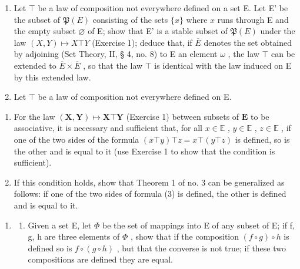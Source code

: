 \begin{enumerate}
\def\labelenumi{\arabic{enumi}.}
\setcounter{enumi}{1}
\item
  Let \(\top\) be a law of composition not everywhere defined on a set E. Let E' be the subset of \(\mathfrak{P}(E)\) consisting of the sets \(\{x\}\) where \(x\) runs through E and the empty subset \(\varnothing\) of E; show that E' is a stable subset of \(\mathfrak{P}(E)\) under the law \((X,Y)\mapsto X\top Y\) (Exercise 1); deduce that, if \(\overline{E}\) denotes the set obtained by adjoining (Set Theory, II, § 4, no. 8) to E an element \(\omega\) , the law \(\top\) can be extended to \(\overline{E} \times \overline{E}\) , so that the law \(\top\) is identical with the law induced on E by this extended law.
\item
  Let \(\top\) be a law of composition not everywhere defined on E.
\end{enumerate}

\begin{enumerate}
\def\labelenumi{(\alph{enumi})}
\item
  For the law \((\mathbf{X}, \mathbf{Y}) \mapsto \mathbf{X} \top \mathbf{Y}\) (Exercise 1) between subsets of \(\mathbf{E}\) to be associative, it is necessary and sufficient that, for all \(x \in \mathbb{E}\) , \(y \in \mathbb{E}\) , \(z \in \mathbb{E}\) , if one of the two sides of the formula \((x \top y) \top z = x \top (y \top z)\) is defined, so is the other and is equal to it (use Exercise 1 to show that the condition is sufficient).
\item
  If this condition holds, show that Theorem 1 of no. 3 can be generalized as follows: if one of the two sides of formula (3) is defined, the other is defined and is equal to it.
\end{enumerate}

\begin{enumerate}
\def\labelenumi{\arabic{enumi}.}
\setcounter{enumi}{3}
\tightlist
\item
  \begin{enumerate}
  \def\labelenumii{(\alph{enumii})}
  \tightlist
  \item
    Given a set E, let \(\Phi\) be the set of mappings into E of any subset of E; if f, g, h are three elements of \(\Phi\) , show that if the composition \((f \circ g) \circ h\) is defined so is \(f \circ (g \circ h)\) , but that the converse is not true; if these two compositions are defined they are equal.
  \end{enumerate}
\end{enumerate}


